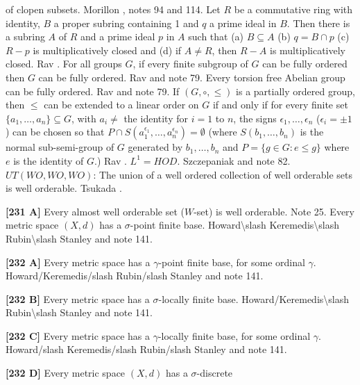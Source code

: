 of clopen subsets.  \ac{Morillon} \cite{1993}, notes 94 and 114.
\medskip
{}  Let $R$ be a commutative ring with identity,
$B$ a proper subring containing 1 and $q$ a prime ideal in $B$.
Then there is a subring $A$ of $R$ and a prime ideal $p$ in $A$
such that (a) $B\subseteq A$ (b) $q = B\cap p$ (c) $R - p$ is
multiplicatively closed and (d) if $A\neq R$, then $R - A$ is
multiplicatively closed.  \ac{Rav} \cite{1977}.
\medskip
{} For all groups $G$, if every finite subgroup of
$G$ can be fully ordered then $G$ can be fully ordered. \ac{Rav}
\cite{1977} and note 79.
\medskip
{} Every torsion free Abelian group can be fully
ordered. \ac{Rav} \cite{1977} and note 79.
\medskip
{} If $(G,\circ,\le)$ is a partially ordered group,
then $\le$ can be extended to a linear order on $G$ if and only if
for every finite set $\{a_{1},\ldots, a_{n}\}\subseteq G$, with
$a_{i}\neq$ the identity for $i = 1$ to $n$, the signs $\epsilon_{1},
\ldots,\epsilon_{n}$ ($\epsilon_{i} = \pm 1$) can be chosen so that $P\cap
S(a^{\epsilon_{1}}_{1},\ldots,a^{\epsilon_{n}}_{n})=\emptyset$ (where
$S(b_{1},\ldots,b_{n})$ is the normal sub-semi-group of $G$ generated
by $b_{1},\ldots, b_{n}$ and $P = \{g\in G: e\le g\}$ where $e$ is
the identity of $G$.) \ac{Rav} \cite{1977}.
\medskip
{} $L^{1} = HOD$. \ac{Szczepaniak} \cite{1977} and
note 82.
\medskip
{} $UT(WO,WO,WO)$: The union of a well ordered
collection of well orderable sets is well orderable. \ac{Tsukada}
\cite{1977}.
\smallskip
\item{}{\bf [231 A]} Every almost well orderable set ($W$-set) is well
orderable.  Note 25.
\medskip
{} Every metric space $(X,d)$ has a $\sigma$-point
finite base.  \ac{Howard\slash Keremedis\slash Rubin\slash Stanley}
\cite{1999} and note 141.
\smallskip
\item{}{\bf [232 A]} Every metric space  has a $\gamma$-point finite base,
for some ordinal $\gamma$.  \ac{Howard/Keremedis/slash Rubin/slash
Stanley}
\cite{1999} and note 141.
\smallskip
\item{}{\bf [232 B]} Every metric space  has a $\sigma$-locally finite
base. \ac{Howard/Keremedis\slash Rubin\slash Stanley} \cite{1999} and
note 141.
\smallskip
\item{}{\bf [232 C]} Every metric space  has a $\gamma$-locally finite base,
for some ordinal $\gamma$. \ac{Howard/slash Keremedis/slash Rubin/slash
Stanley} \cite{1999}
and note 141.
\smallskip
\item{}{\bf [232 D]} Every metric space $(X,d)$ has a $\sigma$-discrete
